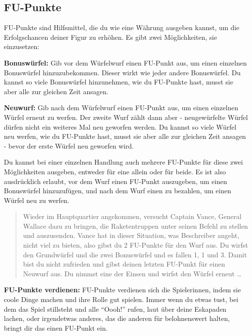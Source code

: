 \documentclass[]{article}
\begin{document}
\subsection{FU-Punkte}\label{fu-punkte}

FU-Punkte sind Hilfsmittel, die du wie eine Währung ausgeben kannst, um
die Erfolgschancen deiner Figur zu erhöhen. Es gibt zwei Möglichkeiten,
sie einzusetzen:

\textbf{Bonuswürfel:} Gib vor dem Würfelwurf einen FU-Punkt aus, um
einen einzelnen Bonuswürfel hinzuzubekommen. Dieser wirkt wie jeder
andere Bonuswürfel. Du kannst so viele Bonuswürfel hinzunehmen, wie du
FU-Punkte hast, musst sie aber alle zur gleichen Zeit ansagen.

\textbf{Neuwurf:} Gib nach dem Würfelwurf einen FU-Punkt aus, um einen
einzelnen Würfel erneut zu werfen. Der zweite Wurf zählt dann aber -
neugewürfelte Würfel dürfen nicht ein weiteres Mal neu geworfen werden.
Du kannst so viele Würfel neu werfen, wie du FU-Punkte hast, musst sie
aber alle zur gleichen Zeit ansagen - bevor der erste Würfel neu
geworfen wird.

Du kannst bei einer einzelnen Handlung auch mehrere FU-Punkte für diese
zwei Möglichkeiten ausgeben, entweder für eine allein oder für beide. Es
ist also ausdrücklich erlaubt, vor dem Wurf einen FU-Punkt auszugeben,
um einen Bonuswürfel hinzuzufügen, und nach dem Wurf einen zu bezahlen,
um einen Würfel neu zu werfen.

\begin{quote}
Wieder im Hauptquartier angekommen, versucht Captain Vance, General
Wallace dazu zu bringen, die Raketentruppen unter seinen Befehl zu
stellen und auszusenden. Vance hat in dieser Situation, was Beschreiber
angeht, nicht viel zu bieten, also gibst du 2 FU-Punkte für den Wurf
aus. Du wirfst den Grundwürfel und die zwei Bonuswürfel und es fallen 1,
1 und 3. Damit bist du nicht zufrieden und gibst deinen letzten FU-Punkt
für einen Neuwurf aus. Du nimmst eine der Einsen und wirfst den Würfel
erneut \ldots{}
\end{quote}

\textbf{FU-Punkte verdienen:} FU-Punkte verdienen sich die Spielerinnen,
indem sie coole Dinge machen und ihre Rolle gut spielen. Immer wenn du
etwas tust, bei dem das Spiel stillsteht und alle ``Oooh!'' rufen, laut
über deine Eskapaden lachen, oder irgendetwas anderes, das die anderen
für belohnenswert halten, bringt dir das einen FU-Punkt ein.
\end{document}
